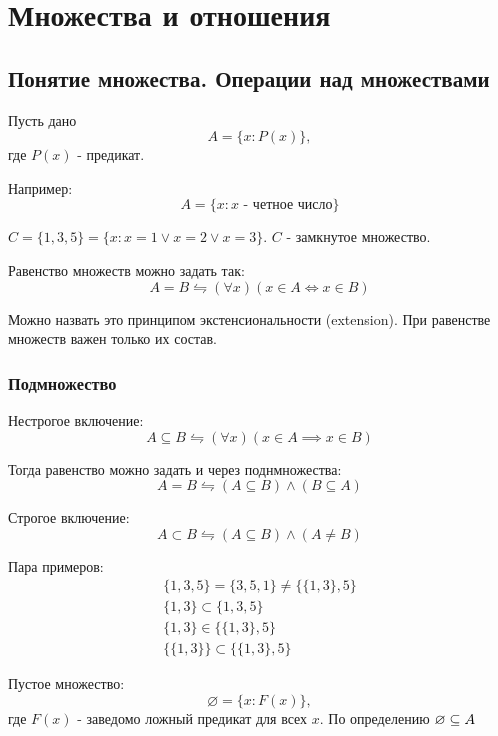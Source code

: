 \chapter{Множества и отношения}
\section{Понятие множества. Операции над множествами}

Пусть дано $$A = \{x: P(x)\},$$ где $P(x)$ - предикат.

\medskip

Например:  \[
	A = \{x: x \text{ - четное число}\} 
\] 

$C = \{1,3,5\} = \{x:x=1 \lor x=2 \lor x=3\}$. $C$ - замкнутое множество.

\medskip

\begin{definition}
Равенство множеств можно задать так:
\[
A = B \leftrightharpoons (\forall x)(x \in A \Longleftrightarrow x \in B)
\] 
\end{definition}
Можно назвать это принципом экстенсиональности (extension).
При равенстве множеств важен только их состав.

\subsection{Подмножество}
\begin{definition}
Нестрогое включение:
$$A \subseteq B \leftrightharpoons (\forall x)(x \in A \implies x \in B)$$
\end{definition}

\medskip

Тогда равенство можно задать и через поднмножества:
\[
A = B \leftrightharpoons (A \subseteq B) \land (B \subseteq A)
\] 
\begin{definition}
Строгое включение: \[
A \subset B \leftrightharpoons (A\subseteq B) \land (A \neq B)
\] 
\end{definition}

Пара примеров:
\begin{gather*}
\{1,3,5\} = \{3,5,1\}  \neq \{\{1,3\},5 \} \\
\{1,3\} \subset \{1,3,5\} \\
\{1,3\} \in \{\{1,3\},5 \} \\
\{\{1,3\} \} \subset \{\{1,3\},5 \}  
\end{gather*}

\medskip

\begin{definition}
Пустое множество:
\[
\varnothing = \{x: F(x)\},
\]
где $F(x)$ - заведомо ложный предикат для всех  $x$.
По определению $\varnothing \subseteq A$
\end{definition}


